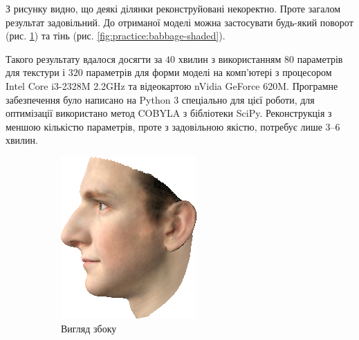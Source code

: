 З рисунку видно, що деякі ділянки реконструйовані некоректно.
Проте загалом результат задовільний.
До отриманої моделі можна застосувати будь-який поворот
(рис. \ref{fig:practice:babbage-profile})
та тінь
(рис. \ref{fig:practice:babbage-shaded}).

Такого результату вдалося досягти за $40$ хвилин
з використанням $80$ параметрів для текстури
і $320$ параметрів для форми моделі
на комп'ютері з процесором Intel Core i3-2328M 2.2GHz
та відеокартою nVidia GeForce 620M.
Програмне забезпечення було написано на Python 3 спеціально для цієї роботи,
для оптимізації використано метод COBYLA \cite{Powell1994} з бібліотеки SciPy.
Реконструкція з меншою кількістю параметрів,
проте з задовільною якістю,
потребує лише 3--6 хвилин.

\begin{figure}[h]
  \centering
  \begin{subfigure}[b]{0.3\textwidth}
    \centering
    \includegraphics[width=\textwidth]{images/babbage-profile}
    \caption{Вигляд збоку}
    \label{fig:practice:babbage-profile}
  \end{subfigure}
  \begin{subfigure}[b]{0.3\textwidth}

\end{subfigure}
\end{figure}
